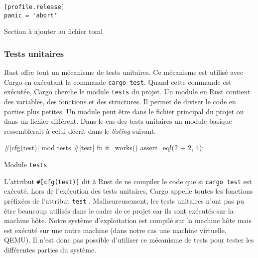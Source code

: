 \begin{code}
\begin{verbatim}
[profile.release]
panic = 'abort'
\end{verbatim}
\caption{Section à ajouter au fichier \acrshort{toml}}
\label{lst:rust:errors:abort}
\end{code} \bigbreak

\subsubsection{Tests unitaires}
Rust offre tout un mécanisme de tests unitaires. Ce mécanisme est utilisé avec
Cargo en exécutant la commande \texttt{cargo test}. Quand cette
commande est exécutée, Cargo cherche le module \texttt{tests} du projet.
Un module en Rust contient des variables, des fonctions et des structures. Il permet
de diviser le code en parties plus petites. Un module peut être dans le fichier
principal du projet ou dans un fichier différent. Dans le cas des tests unitaires
un module basique ressemblerait à celui décrit dans le \textit{listing} suivant.

\begin{code}
\begin{rustcode}
#[cfg(test)]
mod tests {
    #[test]
    fn it_works() {
        assert_eq!(2 + 2, 4);
    }
}
\end{rustcode}
\caption{Module \texttt{tests}}
\label{lst:rust:tests}
\end{code} \bigbreak

L'attribut \texttt{#[cfg(test)]} dit à Rust de ne compiler le code
que si \texttt{cargo test} est exécuté. Lors de l'exécution des tests
unitaires, Cargo appelle toutes les fonctions préfixées de l'attribut \texttt{test}
\cite{ref2}. Malheureusement, les tests unitaires n'ont pas pu être beaucoup utilisés
dans le cadre de ce projet car ils sont exécutés sur la machine hôte. Notre système
d'exploitation est compilé sur la machine hôte mais est exécuté sur une autre
machine (dans notre cas une machine virtuelle, QEMU). Il n'est donc pas possible
d'utiliser ce mécanisme de tests pour tester les différentes parties du système.


